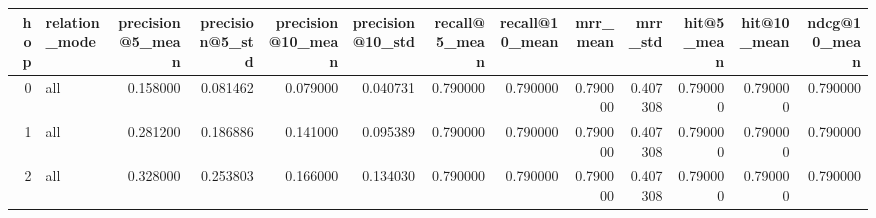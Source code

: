 \begin{tabular}{rlrrrrrrrrrrr}
\toprule
hop & relation_mode & precision@5_mean & precision@5_std & precision@10_mean & precision@10_std & recall@5_mean & recall@10_mean & mrr_mean & mrr_std & hit@5_mean & hit@10_mean & ndcg@10_mean \\
\midrule
0 & all & 0.158000 & 0.081462 & 0.079000 & 0.040731 & 0.790000 & 0.790000 & 0.790000 & 0.407308 & 0.790000 & 0.790000 & 0.790000 \\
1 & all & 0.281200 & 0.186886 & 0.141000 & 0.095389 & 0.790000 & 0.790000 & 0.790000 & 0.407308 & 0.790000 & 0.790000 & 0.790000 \\
2 & all & 0.328000 & 0.253803 & 0.166000 & 0.134030 & 0.790000 & 0.790000 & 0.790000 & 0.407308 & 0.790000 & 0.790000 & 0.790000 \\
\bottomrule
\end{tabular}
